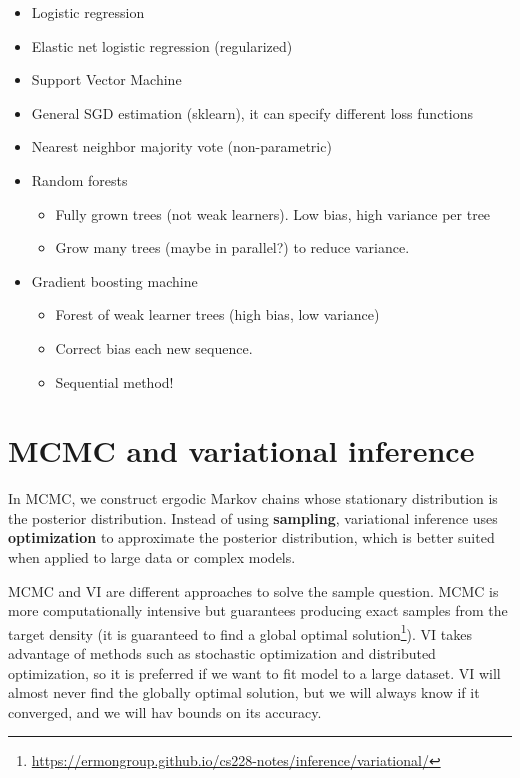 \documentclass[fontset=fandol,zihao=false,scheme=chinese,heading=true,UTF8]{ctexbook}
\providecommand{\tightlist}{%
  \setlength{\itemsep}{0pt}\setlength{\parskip}{0pt}}
\begin{document}
\begin{itemize}
\tightlist
\item
  Logistic regression
\item
  Elastic net logistic regression (regularized)
\item
  Support Vector Machine
\item
  General SGD estimation (sklearn), it can specify different loss functions
\item
  Nearest neighbor majority vote (non-parametric)
\item
  Random forests

  \begin{itemize}
  \tightlist
  \item
    Fully grown trees (not weak learners). Low bias, high variance per tree
  \item
    Grow many trees (maybe in parallel?) to reduce variance.
  \end{itemize}
\item
  Gradient boosting machine

  \begin{itemize}
  \tightlist
  \item
    Forest of weak learner trees (high bias, low variance)
  \item
    Correct bias each new sequence.
  \item
    Sequential method!
  \end{itemize}
\end{itemize}

\hypertarget{mcmc-and-variational-inference}{%
\chapter{MCMC and variational inference}\label{mcmc-and-variational-inference}}

In MCMC, we construct ergodic Markov chains whose stationary distribution is the posterior distribution. Instead of using \textbf{sampling}, variational inference uses \textbf{optimization} to approximate the posterior distribution, which is better suited when applied to large data or complex models.

MCMC and VI are different approaches to solve the sample question. MCMC is more computationally intensive but guarantees producing exact samples from the target density (it is guaranteed to find a global optimal solution\footnote{\url{https://ermongroup.github.io/cs228-notes/inference/variational/}}). VI takes advantage of methods such as stochastic optimization and distributed optimization, so it is preferred if we want to fit model to a large dataset. VI will almost never find the globally optimal solution, but we will always know if it converged, and we will hav bounds on its accuracy.
\end{document}

